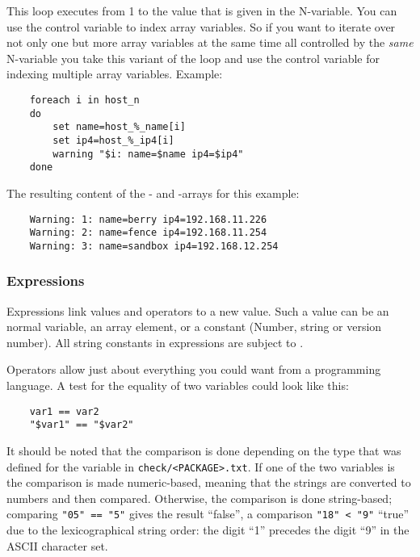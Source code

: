 \begin{enumerate}
    This loop executes from 1 to the value that is given in the N-variable. You can
    use the control variable to index array variables. So if you want to iterate over
    not only one but more array variables at the same time all controlled by the
    \emph{same} N-variable you take this variant of the loop and use the
    control variable for indexing multiple array variables. Example:

\begin{example}
\begin{verbatim}
    foreach i in host_n
    do
        set name=host_%_name[i]
        set ip4=host_%_ip4[i]
        warning "$i: name=$name ip4=$ip4"
    done
\end{verbatim}
\end{example}

    The resulting content of the - and -arrays
    for this example:

\begin{example}
\begin{verbatim}
    Warning: 1: name=berry ip4=192.168.11.226
    Warning: 2: name=fence ip4=192.168.11.254
    Warning: 3: name=sandbox ip4=192.168.12.254
\end{verbatim}
\end{example}

    \end{enumerate}

\subsubsection{Expressions}

    Expressions link values and operators to a new value. Such a value
    can be an normal variable, an array element, or a constant (Number,
    string or version number). All string constants in expressions are
    subject to .

    Operators allow just about everything you could want from a
    programming language. A test for the equality of two variables
    could look like this:

\begin{example}
\begin{verbatim}
    var1 == var2
    "$var1" == "$var2"
\end{verbatim}
\end{example}

    It should be noted that the comparison is done depending on the type
    that was defined for the variable in \texttt{check/<PACKAGE>.txt}.
    If one of the two variables is 
    the comparison is made numeric-based, meaning that the strings are
    converted to numbers and then compared. Otherwise, the comparison is done
    string-based; comparing \texttt{"05"\ == "5"} gives the result ``false'',
    a comparison \texttt{"18"\ < "9"} ``true'' due to the lexicographical string
    order: the digit ``1'' precedes the digit  ``9'' in the ASCII character set.

